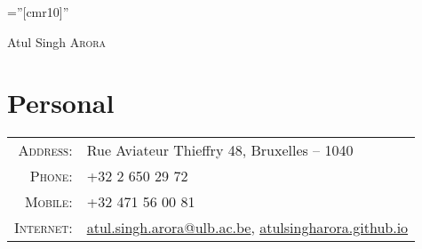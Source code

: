 \documentclass[a4paper,10pt]{article}
\begin{document}

\pagestyle{empty} %

\font\fb=''[cmr10]'' %

\par{\centering
		{\Huge Atul Singh \textsc{Arora}
	}\bigskip\par}

\section{Personal}

\begin{tabular}{rl}
    \textsc{Address:}   & Rue Aviateur Thieffry 48, Bruxelles -- 1040 \\
    \textsc{Phone:}     & +32 2 650 29 72\\ 
    \textsc{Mobile:}      & +32 471 56 00 81\\
    \textsc{Internet:}     & \href{mailto:atul.singh.arora@ulb.ac.be}{atul.singh.arora@ulb.ac.be}, \href{https://atulsingharora.github.io}{atulsingharora.github.io}
\end{tabular}

\end{document}
